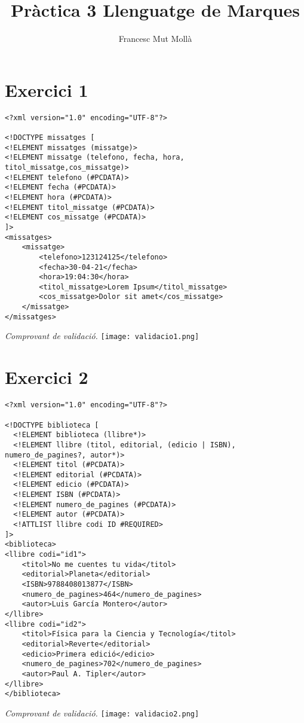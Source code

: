 \documentclass{article}
\title{Pràctica 3 Llenguatge de Marques}
\author{Francesc Mut Mollà}
\begin{document}
\maketitle
\newpage
\section{Exercici 1}

\begin{verbatim}
<?xml version="1.0" encoding="UTF-8"?>

<!DOCTYPE missatges [
<!ELEMENT missatges (missatge)>
<!ELEMENT missatge (telefono, fecha, hora, titol_missatge,cos_missatge)>
<!ELEMENT telefono (#PCDATA)>
<!ELEMENT fecha (#PCDATA)>
<!ELEMENT hora (#PCDATA)>
<!ELEMENT titol_missatge (#PCDATA)>
<!ELEMENT cos_missatge (#PCDATA)>
]>
<missatges>
    <missatge>
        <telefono>123124125</telefono>
        <fecha>30-04-21</fecha>
        <hora>19:04:30</hora>
        <titol_missatge>Lorem Ipsum</titol_missatge>
        <cos_missatge>Dolor sit amet</cos_missatge>
    </missatge>
</missatges>
\end{verbatim}
\vspace{3cm}
\begin{center}
\textit{Comprovant de validació.}
\texttt{[image: validacio1.png]}
\end{center}

\newpage


\section{Exercici 2}

\begin{verbatim}
<?xml version="1.0" encoding="UTF-8"?>

<!DOCTYPE biblioteca [
  <!ELEMENT biblioteca (llibre*)>
  <!ELEMENT llibre (titol, editorial, (edicio | ISBN), numero_de_pagines?, autor*)>
  <!ELEMENT titol (#PCDATA)>
  <!ELEMENT editorial (#PCDATA)>
  <!ELEMENT edicio (#PCDATA)>
  <!ELEMENT ISBN (#PCDATA)>
  <!ELEMENT numero_de_pagines (#PCDATA)>
  <!ELEMENT autor (#PCDATA)>
  <!ATTLIST llibre codi ID #REQUIRED>
]>
<biblioteca>
<llibre codi="id1">
    <titol>No me cuentes tu vida</titol>
    <editorial>Planeta</editorial>
    <ISBN>9788408013877</ISBN>
    <numero_de_pagines>464</numero_de_pagines>
    <autor>Luis García Montero</autor>
</llibre>
<llibre codi="id2">
    <titol>Física para la Ciencia y Tecnología</titol>
    <editorial>Reverte</editorial>
    <edicio>Primera edició</edicio>
    <numero_de_pagines>702</numero_de_pagines>
    <autor>Paul A. Tipler</autor>
</llibre>
</biblioteca>
\end{verbatim}
\vspace{0,5cm}
\begin{center}
    \textit{Comprovant de validació.}
    \texttt{[image: validacio2.png]}
\end{center}
    
\end{document}
